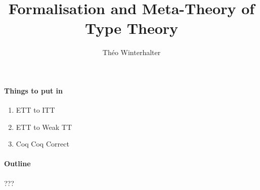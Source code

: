 \documentclass{report}
\title{Formalisation and Meta-Theory of Type Theory}
\author{Théo Winterhalter}
\begin{document}
\maketitle

\paragraph{Things to put in}

\begin{enumerate}
  \item ETT to ITT
  \item ETT to Weak TT
  \item Coq Coq Correct
\end{enumerate}

\paragraph{Outline}

???
\end{document}

